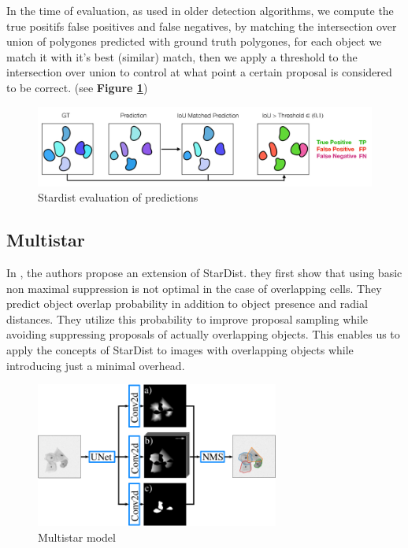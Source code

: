 \documentclass[main.tex]{subfiles}
\begin{document}
In the time of evaluation, as used in older detection algorithms, we compute the true positifs false positives and false negatives, by matching the intersection over union of polygones predicted with ground truth polygones, for each object we match it with it's best (similar) match, then we apply a threshold to the intersection over union to control at what point a certain proposal is considered to be correct. (see \textbf{Figure \ref{fig:stardistOutput}})

\begin{figure}[H]
    \centering
    \includegraphics[width=16cm]{images/stardistEval.PNG}
    \caption{Stardist evaluation of predictions}
    \label{fig:stardistOutput}
\end{figure}

\subsection{Multistar}
In \cite{Walter2020}, the authors propose an extension of StarDist. they first show that using basic non maximal suppression is not optimal in the case of overlapping cells. They predict object overlap probability in addition to object presence and radial distances. They utilize this probability to improve proposal sampling while avoiding suppressing proposals of actually overlapping objects. This enables us to apply the concepts of StarDist to images with overlapping objects while introducing just a minimal overhead. 

\begin{figure}[H]
    \centering
    \includegraphics[width=8cm]{images/multistar.png}
    \caption{Multistar model}
    \label{fig:ac}
\end{figure}
\end{document}
